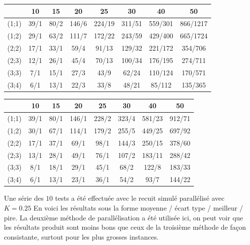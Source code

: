 \documentclass[12pt,a4paper]{article}
\begin{document}
\begin{center}
\begin{tabular}{|c|c|c|c|c|c|c|c|}
\hline
&10 & 15 & 20 & 25 & 30 & 40 & 50\\
\hline 
(1;1) & 39/1 & 80/2 & 146/6 & 224/19 & 311/51 & 559/301 & 866/1217 \\ 
\hline 
(1;2) & 29/1 & 63/2 & 111/7 & 172/22 & 243/59 & 429/400 & 665/1724 \\ 
\hline 
(2;2) & 17/1 & 33/1 & 59/4 & 91/13 & 129/32 & 221/172 & 354/706 \\ 
\hline 
(2;3) & 12/1 & 26/1 & 45/4& 70/13 & 100/34 & 176/195 & 274/711 \\ 
\hline 
(3;3) & 7/1 & 15/1 & 27/3 & 43/9 & 62/24 & 110/124 & 170/571 \\ 
\hline 
(3;4) & 6/1 & 13/1 & 22/3 & 33/8 & 48/21 & 85/112 & 135/365 \\ 
\hline 
\end{tabular} 

\begin{tabular}{|c|c|c|c|c|c|c|c|}
\hline
&10 & 15 & 20 & 25 & 30 & 40 & 50\\
\hline 
(1;1) & 39/1 & 80/1 & 146/1 & 228/2 & 323/4 & 581/23 & 912/71 \\ 
\hline 
(1;2) & 30/1 & 67/1 & 114/1 & 179/2 & 255/5 & 449/25 & 697/92 \\ 
\hline 
(2;2) & 17/1 & 37/1 & 69/1 & 98/1 & 144/3 & 250/15 & 378/60 \\ 
\hline 
(2;3) & 13/1 & 28/1 & 49/1& 76/1 & 107/2 & 183/11 & 288/42 \\ 
\hline 
(3;3) & 8/1 & 18/1 & 29/1 & 45/1 & 68/2 & 122/8 & 183/33 \\ 
\hline 
(3;4) & 6/1 & 13/1 & 23/1 & 36/1 & 54/2 & 93/7 & 144/22 \\ 
\hline 
\end{tabular}
\end{center} 

Une série des $10$ tests a été effectuée avec le recuit simulé parallélisé avec $K=0.25$
En voici les résultats sous la forme moyenne / écart type / meilleur / pire. La deuxième méthode de parallélisation a été utilisée ici, on peut voir que les résultats produit sont moins bons que ceux de la troisième méthode de façon consistante, surtout pour les plus grosses instances.
\end{document}
